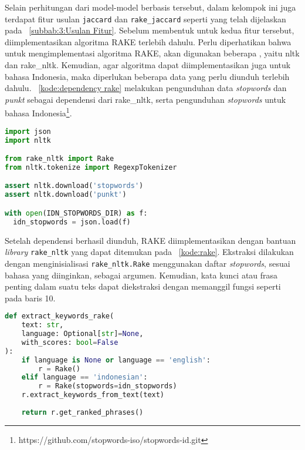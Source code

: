 Selain perhitungan dari model-model berbasis \txt{} \matching{} tersebut, dalam kelompok ini juga terdapat fitur usulan \lstinline{jaccard} dan \lstinline{rake_jaccard} seperti yang telah dijelaskan pada \subbab{}~\ref{subbab:3:Usulan Fitur}. Sebelum membentuk \pipeline{} untuk kedua fitur tersebut, diimplementasikan algoritma RAKE terlebih dahulu. Perlu diperhatikan bahwa untuk mengimplementasi algoritma RAKE, akan digunakan beberapa \library{}, yaitu nltk dan rake\_nltk. Kemudian, agar algoritma dapat diimplementasikan juga untuk bahasa Indonesia, maka diperlukan beberapa data yang perlu diunduh terlebih dahulu. \kode{}~\ref{kode:dependency rake} melakukan pengunduhan data \textit{stopwords} dan \textit{punkt} sebagai dependensi dari \library{} rake\_nltk, serta pengunduhan \textit{stopwords} untuk bahasa Indonesia\footnote{https://github.com/stopwords-iso/stopwords-id.git}.
\begin{lstlisting}[language=Python, caption={Dependensi algoritma RAKE}, label={kode:dependency rake}]
import json
import nltk

from rake_nltk import Rake
from nltk.tokenize import RegexpTokenizer

assert nltk.download('stopwords')
assert nltk.download('punkt')

with open(IDN_STOPWORDS_DIR) as f:
  idn_stopwords = json.load(f)
\end{lstlisting}

Setelah dependensi berhasil diunduh, RAKE diimplementasikan dengan bantuan \textit{library} \lstinline{rake_nltk} yang dapat ditemukan pada \kode{}~\ref{kode:rake}. Ekstraksi dilakukan dengan menginisialisasi \lstinline{rake_nltk.Rake} menggunakan daftar \textit{stopwords}, sesuai bahasa yang diinginkan, sebagai argumen. Kemudian, kata kunci atau frasa penting dalam suatu teks dapat diekstraksi dengan memanggil fungsi seperti pada baris 10.
\begin{lstlisting}[language=Python, caption={Implementasi RAKE}, label={kode:rake}]
def extract_keywords_rake(
    text: str,
    language: Optional[str]=None,
    with_scores: bool=False
):
    if language is None or language == 'english':
        r = Rake()
    elif language == 'indonesian':
        r = Rake(stopwords=idn_stopwords)
    r.extract_keywords_from_text(text)
    
    return r.get_ranked_phrases()
\end{lstlisting}

